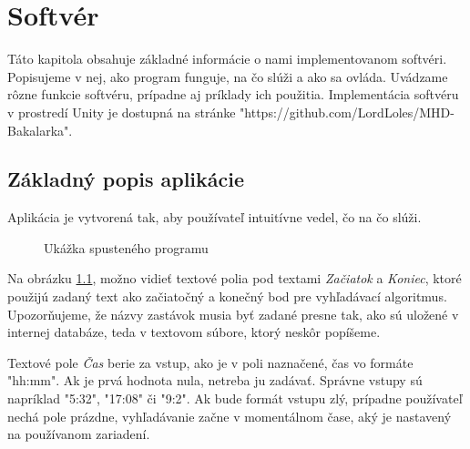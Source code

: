 \chapter{Softvér}
\label{kap:softver}

Táto kapitola obsahuje základné informácie o nami implementovanom softvéri. Popisujeme v nej, ako program funguje, na čo slúži a ako sa ovláda. Uvádzame rôzne funkcie softvéru, prípadne aj príklady ich použitia. Implementácia softvéru v prostredí Unity je dostupná na stránke "https://github.com/LordLoles/MHD-Bakalarka".


\section{Základný popis aplikácie}

Aplikácia je vytvorená tak, aby používateľ intuitívne vedel, čo na čo slúži.\newline

\begin{figure}[H]
  \caption{Ukážka spusteného programu}
  \label{ukazka_programu1}
\end{figure}

Na obrázku \ref{ukazka_programu1}, možno vidieť textové polia pod textami \textit{Začiatok} a \textit{Koniec}, ktoré použijú zadaný text ako začiatočný a konečný bod pre vyhľadávací algoritmus. Upozorňujeme, že názvy zastávok musia byť zadané presne tak, ako sú uložené v internej databáze, teda v textovom súbore, ktorý neskôr popíšeme.\newline

Textové pole \textit{Čas} berie za vstup, ako je v poli naznačené, čas vo formáte "hh:mm". Ak je prvá hodnota nula, netreba ju zadávať. Správne vstupy sú napríklad "5:32", "17:08"  či "9:2". Ak bude formát vstupu zlý, prípadne používateľ nechá pole prázdne, vyhľadávanie začne v momentálnom čase, aký je nastavený na používanom zariadení.\newline

